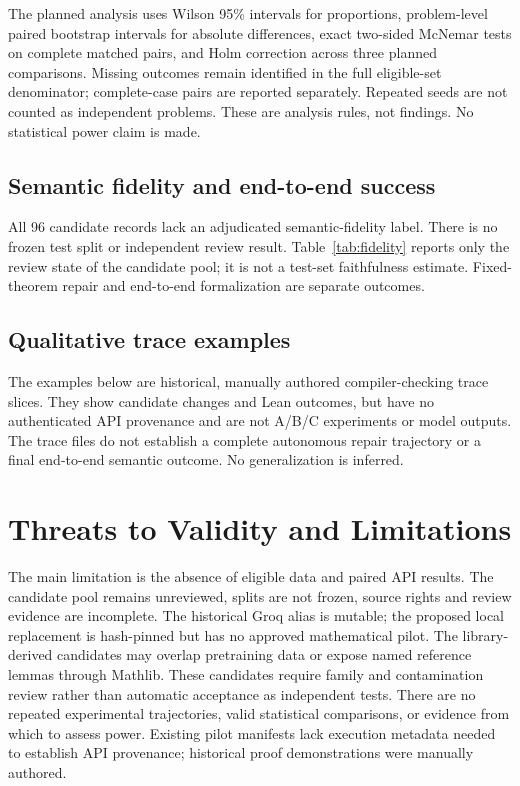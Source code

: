 \documentclass[runningheads,a4paper]{llncs}
\begin{document}
The planned analysis uses Wilson 95\% intervals for proportions, problem-level
paired bootstrap intervals for absolute differences, exact two-sided McNemar
tests on complete matched pairs, and Holm correction across three planned
comparisons. Missing outcomes remain identified in the full eligible-set
denominator; complete-case pairs are reported separately. Repeated seeds are
not counted as independent problems. These are analysis rules, not findings.
No statistical power claim is made.

\subsection{Semantic fidelity and end-to-end success}
All 96 candidate records lack an adjudicated semantic-fidelity label. There
is no frozen test split or independent review result. Table~\ref{tab:fidelity}
reports only the review state of the candidate pool; it is not a test-set
faithfulness estimate. Fixed-theorem repair and end-to-end formalization are
separate outcomes.
\begin{table}
\caption{Candidate semantic-review state, not test-set faithfulness results.}
\label{tab:fidelity}\centering

\end{table}

\subsection{Qualitative trace examples}
The examples below are historical, manually authored compiler-checking trace
slices. They show candidate changes and Lean outcomes, but have no authenticated
API provenance and are not A/B/C experiments or model outputs. The trace files
do not establish a complete autonomous repair trajectory or a final
end-to-end semantic outcome. No generalization is inferred.


\section{Threats to Validity and Limitations}
The main limitation is the absence of eligible data and paired API results.
The candidate pool remains unreviewed, splits are not frozen, source rights and review
evidence are incomplete. The historical Groq alias is mutable; the proposed
local replacement is hash-pinned but has no approved mathematical pilot. The
library-derived candidates may overlap pretraining data or expose named
reference lemmas through Mathlib. These candidates require family and
contamination review rather than automatic acceptance as independent tests. There are no repeated
experimental trajectories, valid statistical comparisons, or evidence from
which to assess power. Existing pilot manifests lack execution metadata needed
to establish API provenance; historical proof demonstrations were manually
authored.
\end{document}
